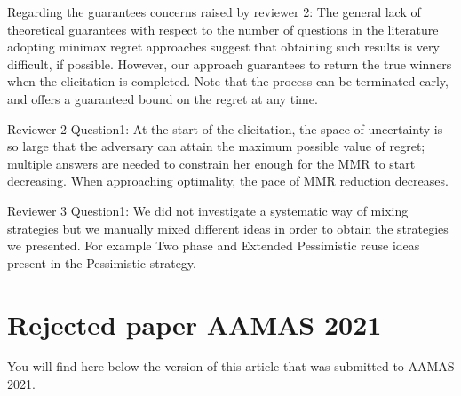 \documentclass[version=3.21, pagesize, twoside=off, bibliography=totoc, DIV=calc, fontsize=12pt, a4paper]{scrartcl}
\begin{document}
Regarding the guarantees concerns raised by reviewer 2: The general lack of theoretical guarantees with respect to the number of questions in the literature adopting minimax regret approaches suggest that obtaining such results is very difficult, if possible. However, our approach guarantees to return the true winners when the elicitation is completed. Note that the process can be terminated early, and offers a guaranteed bound on the regret at any time.

Reviewer 2 Question1: At the start of the elicitation, the space of uncertainty is so large that the adversary can attain the maximum possible value of regret; multiple answers are needed to constrain her enough for the MMR to start decreasing. When approaching optimality, the pace of MMR reduction decreases.

Reviewer 3 Question1: We did not investigate a systematic way of mixing strategies but we manually mixed different ideas in order to obtain the strategies we presented. For example Two phase and Extended Pessimistic reuse ideas present in the Pessimistic strategy.

\section{Rejected paper AAMAS 2021}
You will find here below the version of this article that was submitted to AAMAS 2021.
%
\end{document}
